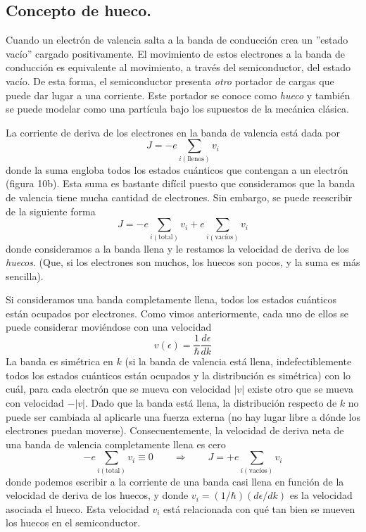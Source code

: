 \documentclass[12pt,a4paper]{article}
\begin{document}
\subsection{Concepto de hueco.}

Cuando un electrón de valencia salta a la banda de conducción crea un ''estado vacío'' cargado positivamente. El movimiento de estos electrones a la banda de conducción es equivalente al movimiento, a través del semiconductor, del estado vacío. De esta forma, el semiconductor presenta \emph{otro} portador de cargas que puede dar lugar a una corriente. Este portador se conoce como \emph{hueco} y también se puede modelar como una partícula bajo los supuestos de la mecánica clásica.

La corriente de deriva de los electrones en la banda de valencia está dada por
\[ J= -e \sum _{i (\textrm{llenos})} v_{i} \]
donde la suma engloba todos los estados cuánticos que contengan a un electrón (figura 10b). Esta suma es bastante difícil puesto que consideramos que la banda de valencia tiene mucha cantidad de electrones. Sin embargo, se puede reescribir de la siguiente forma
\[ J = -e \sum _{i (\textrm{total})} v_{i} + e \sum _{i (\textrm{vacíos})} v_{i} \]
donde consideramos a la banda llena y le restamos la velocidad de deriva de los \emph{huecos}. (Que, si los electrones son muchos, los huecos son pocos, y la suma es más sencilla).

Si consideramos una banda completamente llena, todos los estados cuánticos están ocupados por electrones. Como vimos anteriormente, cada uno de ellos se puede considerar moviéndose con una velocidad
\[ v(\epsilon) = \frac{1}{\hbar} \frac{d\epsilon}{dk} \]
La banda es simétrica en $k$ (si la banda de valencia está llena, indefectiblemente todos los estados cuánticos están ocupados y la distribución es simétrica) con lo cuál, para cada electrón que se mueva con velocidad $|v|$ existe otro que se mueva con velocidad $-|v|$. Dado que la banda está llena, la distribución respecto de $k$ no puede ser cambiada al aplicarle una fuerza externa (no hay lugar libre a dónde los electrones puedan moverse). Consecuentemente, la velocidad de deriva neta de una banda de valencia completamente llena es cero
\[ -e \sum _{i (\textrm{total})} v_{i} \equiv 0 \qquad \Rightarrow \qquad J=+e \sum _{i (\textrm{vacíos}) } v_{i} \]
donde podemos escribir a la corriente de una banda casi llena en función de la velocidad de deriva de los huecos, y donde $v_{i} = (1/\hbar) (d\epsilon/dk)$ es la velocidad asociada el hueco. Esta velocidad $v_{i}$ está relacionada con qué tan bien se mueven los huecos en el semiconductor.
\end{document}
